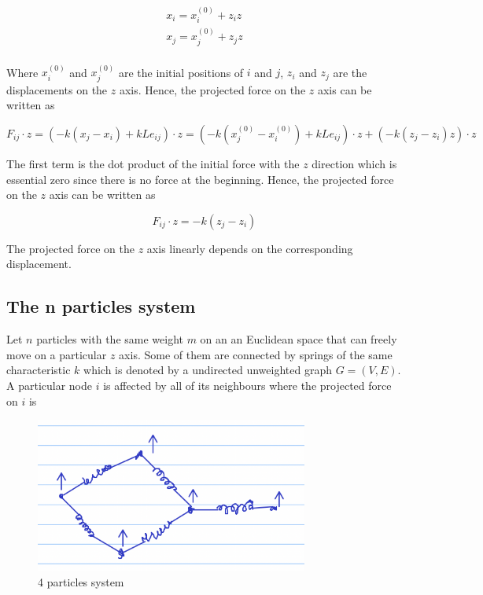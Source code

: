 \documentclass{article}
\begin{document}
\begin{gather*}
    x_i = x_i^{(0)} + z_i z \\
    x_j = x_j^{(0)} + z_j z \\
\end{gather*}

Where $x_i^{(0)}$ and $x_j^{(0)}$ are the initial positions of $i$ and $j$, $z_i$ and $z_j$ are the displacements on the $z$ axis. Hence, the projected force on the $z$ axis can be written as

\begin{equation}
    F_{i j} \cdot z = (- k (x_j - x_i) + k L e_{i j}) \cdot z = (- k (x_j^{(0)} - x_i^{(0)}) + k L e_{i j}) \cdot z + (- k (z_j - z_i) z) \cdot z
\end{equation}

The first term is the dot product of the initial force with the $z$ direction which is essential zero since there is no force at the beginning. Hence, the projected force on the $z$ axis can be written as

\begin{equation}
    F_{i j} \cdot z = - k (z_j - z_i)
\end{equation}

The projected force on the $z$ axis linearly depends on the corresponding displacement.

\subsection{The n particles system}

Let $n$ particles with the same weight $m$ on an an Euclidean space that can freely move on a particular $z$ axis. Some of them are connected by springs of the same characteristic $k$ which is denoted by a undirected unweighted graph $G = (V, E)$. A particular node $i$ is affected by all of its neighbours where the projected force on $i$ is

\begin{figure}[h!]
\centering
\includegraphics[width=0.8\textwidth]{fig2.png}
\caption{4 particles system}
\label{fig:fig2}
\end{figure}
\end{document}
